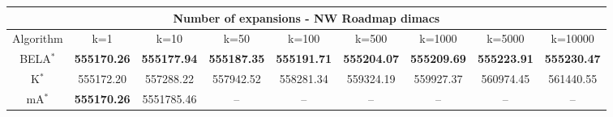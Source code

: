 \begin{tabular}{c|cccccccc}\toprule
\multicolumn{9}{c}{Number of expansions - NW Roadmap dimacs}\\ \midrule
Algorithm & k=1 & k=10 & k=50 & k=100 & k=500 & k=1000 & k=5000 & k=10000 \\ \midrule
BELA$^*$ & \textbf{555170.26} & \textbf{555177.94} & \textbf{555187.35} & \textbf{555191.71} & \textbf{555204.07} & \textbf{555209.69} & \textbf{555223.91} & \textbf{555230.47} \\
K$^*$ & 555172.20 & 557288.22 & 557942.52 & 558281.34 & 559324.19 & 559927.37 & 560974.45 & 561440.55 \\
mA$^*$ & \textbf{555170.26} & 5551785.46 & -- & -- & -- & -- & -- & -- \\ \bottomrule 
\end{tabular}
